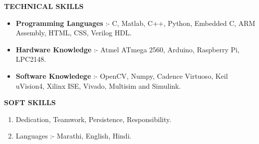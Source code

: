 \documentclass[a4paper]{article}
\begin{document}

	\begin{flushleft}
		\vspace{5mm}
		\large{\textbf{TECHNICAL SKILLS }} 
		\vspace{0.5mm}
		\noindent\hrulefill
		\vspace{0.5mm}
	\end{flushleft}
	\begin{itemize}
		\item \textbf{Programming Languages} :- C, Matlab, C++, Python, Embedded C, ARM Assembly, HTML, CSS, Verilog HDL.
		\item \textbf{Hardware Knowledge} :- Atmel ATmega 2560, Arduino, Raspberry Pi, LPC2148.
		\item \textbf{Software Knowledege} :- OpenCV, Numpy, Cadence Virtuoso, Keil uVision4, Xilinx ISE, Vivado, Multisim and Simulink.		             
	\end{itemize}

	\begin{flushleft}
		\vspace{5mm}
		\large{\textbf{SOFT SKILLS }} 
		\vspace{0.5mm}
		\noindent\hrulefill
		\vspace{0.5mm}
	\end{flushleft}
	\begin{enumerate}
		\item  Dedication, Teamwork, Persistence, Responsibility.
		\item  Languages :- Marathi, English, Hindi.        
	\end{enumerate}
\end{document}
